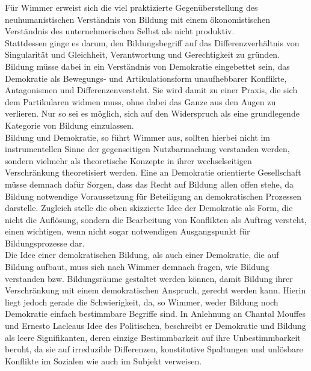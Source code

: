 Für Wimmer erweist sich die viel praktizierte Gegenüberstellung des
neuhumanistischen Verständnis von Bildung mit einem ökonomistischen Verständnis
des unternehmerischen Selbst als nicht produktiv.\\
Stattdessen ginge es darum,
\glqq den Bildungsbegriff auf das Differenzverhältnis von Singularität und
Gleichheit, Verantwortung und Gerechtigkeit zu gründen.\grqq\footnotemark
{} Bildung müsse dabei
in ein Verständnis von Demokratie eingebettet sein, das Demokratie als
\glqq Bewegungs- und Artikulationsform unaufhebbarer Konflikte, Antagonismen und
Differenzen\grqq versteht. Sie wird damit zu einer Praxis, die sich dem
Partikularen widmen muss, ohne dabei das Ganze aus den Augen zu verlieren. Nur
so sei es möglich, sich auf den Widerspruch als eine grundlegende Kategorie von
Bildung einzulassen.\\
Bildung und Demokratie, so führt Wimmer aus, sollten
hierbei nicht im instrumentellen Sinne der gegenseitigen Nutzbarmachung
verstanden werden, sondern vielmehr als theoretische Konzepte in ihrer
wechselseitigen Verschränkung theoretisiert werden. Eine an Demokratie
orientierte Gesellschaft müsse demnach dafür Sorgen, dass das Recht auf Bildung
allen offen stehe, da Bildung notwendige Voraussetzung für Beteiligung an
demokratischen Prozessen darstelle. Zugleich stelle die oben skizzierte Idee
der Demokratie als Form, die nicht die Auflösung, sondern die Bearbeitung von
Konflikten als Auftrag versteht, einen wichtigen, wenn nicht sogar notwendigen
Ausgangspunkt für Bildungsprozesse dar.\footnotemark {}\\
Die Idee einer demokratischen Bildung,
als auch einer Demokratie, die auf Bildung aufbaut, muss sich nach Wimmer
demnach fragen, wie Bildung verstanden bzw. Bildungsräume gestaltet werden
können, damit Bildung ihrer Verschränkung mit einem demokratischen Anspruch,
gerecht werden kann. Hierin liegt jedoch gerade die Schwierigkeit, da, so
Wimmer, weder Bildung noch Demokratie einfach bestimmbare Begriffe sind. In
Anlehnung an Chantal Mouffes und Ernesto Lacleaus Idee des Politischen,
beschreibt er Demokratie und Bildung als leere Signifikanten, deren einzige
Bestimmbarkeit auf ihre Unbestimmbarkeit beruht, da sie \glqq auf irreduzible
Differenzen, konstitutive Spaltungen und unlösbare Konflikte im Sozialen wie
auch im Subjekt\grqq\footnotemark {} verweisen.\\ 

